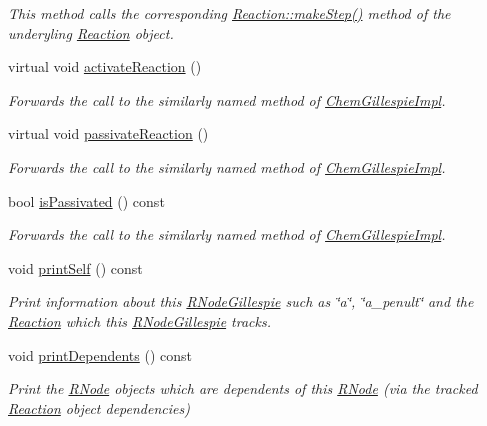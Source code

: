 \begin{DoxyCompactItemize}
\begin{DoxyCompactList}\small\item\em This method calls the corresponding \hyperlink{classReactionBase_a565e2d5fac7efaf63f19dab909428882}{Reaction\+::make\+Step()} method of the underyling \hyperlink{classReaction}{Reaction} object. \end{DoxyCompactList}\item 
virtual void \hyperlink{classRNodeGillespie_ab223d02c7a604123c8d7c451e5d86a33}{activate\+Reaction} ()
\begin{DoxyCompactList}\small\item\em Forwards the call to the similarly named method of \hyperlink{classChemGillespieImpl}{Chem\+Gillespie\+Impl}. \end{DoxyCompactList}\item 
virtual void \hyperlink{classRNodeGillespie_a2d5ed4fab56ebe5e90a0b7f7e605b90b}{passivate\+Reaction} ()
\begin{DoxyCompactList}\small\item\em Forwards the call to the similarly named method of \hyperlink{classChemGillespieImpl}{Chem\+Gillespie\+Impl}. \end{DoxyCompactList}\item 
bool \hyperlink{classRNodeGillespie_abf9dd2df1932720822ac6b1faeb70b25}{is\+Passivated} () const 
\begin{DoxyCompactList}\small\item\em Forwards the call to the similarly named method of \hyperlink{classChemGillespieImpl}{Chem\+Gillespie\+Impl}. \end{DoxyCompactList}\item 
void \hyperlink{classRNodeGillespie_a178f4be92754cfb40dcb6f5fb25dbaa6}{print\+Self} () const 
\begin{DoxyCompactList}\small\item\em Print information about this \hyperlink{classRNodeGillespie}{R\+Node\+Gillespie} such as \char`\"{}a\char`\"{}, \char`\"{}a\+\_\+penult\char`\"{} and the \hyperlink{classReaction}{Reaction} which this \hyperlink{classRNodeGillespie}{R\+Node\+Gillespie} tracks. \end{DoxyCompactList}\item 
void \hyperlink{classRNodeGillespie_ac3e927cc00182eca3289cf6a4587d2dd}{print\+Dependents} () const 
\begin{DoxyCompactList}\small\item\em Print the \hyperlink{classRNode}{R\+Node} objects which are dependents of this \hyperlink{classRNode}{R\+Node} (via the tracked \hyperlink{classReaction}{Reaction} object dependencies) \end{DoxyCompactList}\end{DoxyCompactItemize}
